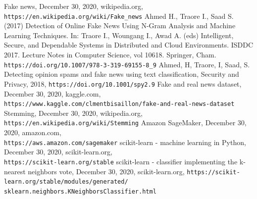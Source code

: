\documentclass[a4paper,12pt,nottoc]{article}
\begin{document}
%
\begin{thebibliography}{9}
 Fake news, December 30, 2020, wikipedia.org, \\\texttt{https://en.wikipedia.org/wiki/Fake\_news}
 Ahmed H., Traore I., Saad S. (2017) Detection of Online Fake News Using N-Gram Analysis and Machine Learning Techniques. In: Traore I., Woungang I., Awad A. (eds) Intelligent, Secure, and Dependable Systems in Distributed and Cloud Environments. ISDDC 2017. Lecture Notes in Computer Science, vol 10618. Springer, Cham. \texttt{https://doi.org/10.1007/978-3-319-69155-8\_9}
 Ahmed, H, Traore, I, Saad, S. Detecting opinion spams and fake news using text classification, Security and Privacy, 2018, \texttt{https://doi.org/10.1001/spy2.9}
 Fake and real news dataset, December 30, 2020, kaggle.com, \\\texttt{https://www.kaggle.com/clmentbisaillon/fake-and-real-news-dataset}
 Stemming, December 30, 2020, wikipedia.org, \\\texttt{https://en.wikipedia.org/wiki/Stemming}
 Amazon SageMaker, December 30, 2020, amazon.com, \\\texttt{https://aws.amazon.com/sagemaker}
 scikit-learn - machine learning in Python, December 30, 2020, scikit-learn.org, \\\texttt{https://scikit-learn.org/stable}
 scikit-learn - classifier implementing the k-nearest neighbors vote, December 30, 2020, scikit-learn.org, \texttt{https://scikit-learn.org/stable/modules/generated/\\sklearn.neighbors.KNeighborsClassifier.html}
\end{thebibliography}
\end{document}
